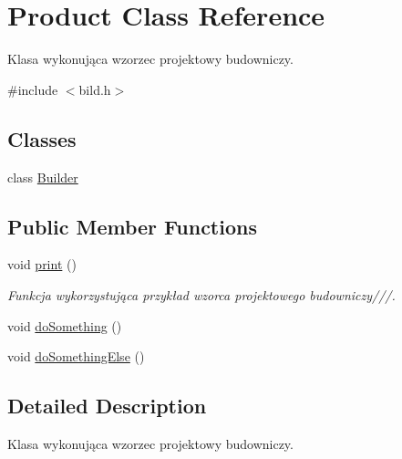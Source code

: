 \hypertarget{class_product}{\section{Product Class Reference}
\label{class_product}
}


Klasa wykonująca wzorzec projektowy budowniczy.  




{\ttfamily \#include $<$bild.\-h$>$}

\subsection*{Classes}
\begin{DoxyCompactItemize}
\item 
class \hyperlink{class_product_1_1_builder}{Builder}
\end{DoxyCompactItemize}
\subsection*{Public Member Functions}
\begin{DoxyCompactItemize}
\item 
void \hyperlink{class_product_a82a40e1860ffe2c88ea08084037a6c42}{print} ()
\begin{DoxyCompactList}\small\item\em Funkcja wykorzystująca przykład wzorca projektowego budowniczy///. \end{DoxyCompactList}\item 
void \hyperlink{class_product_a7f4b07a88eb735a731fdec67d6ec4589}{do\-Something} ()
\item 
void \hyperlink{class_product_a0a00c5986d95bc8952e45ccfc32817d2}{do\-Something\-Else} ()
\end{DoxyCompactItemize}


\subsection{Detailed Description}
Klasa wykonująca wzorzec projektowy budowniczy. 

